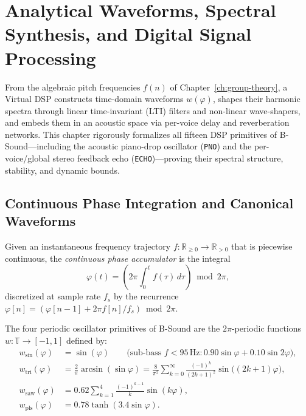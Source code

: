 \chapter{Analytical Waveforms, Spectral Synthesis, and Digital Signal Processing}
\label{ch:waveforms-dsp}

From the algebraic pitch frequencies $f(n)$ of Chapter~\ref{ch:group-theory}, a Virtual DSP constructs time-domain waveforms $w(\varphi)$, shapes their harmonic spectra through linear time-invariant (LTI) filters and non-linear wave-shapers, and embeds them in an acoustic space via per-voice delay and reverberation networks. This chapter rigorously formalizes all fifteen DSP primitives of B-Sound—including the acoustic piano-drop oscillator (\texttt{PNO}) and the per-voice/global stereo feedback echo (\texttt{ECHO})—proving their spectral structure, stability, and dynamic bounds.

\section{Continuous Phase Integration and Canonical Waveforms}

\begin{definition}
Given an instantaneous frequency trajectory $f : \mathbb{R}_{\ge 0} \to \mathbb{R}_{>0}$ that is piecewise continuous, the \emph{continuous phase accumulator} is the integral
\begin{equation}
\label{eq:phase-acc}
\varphi(t) = \left(2\pi \int_0^t f(\tau)\,d\tau\right) \bmod 2\pi,
\end{equation}
discretized at sample rate $f_s$ by the recurrence $\varphi[n] = (\varphi[n-1] + 2\pi f[n]/f_s) \bmod 2\pi$.
\end{definition}

\begin{definition}
The four periodic oscillator primitives of B-Sound are the $2\pi$-periodic functions $w : \mathbb{T} \to [-1, 1]$ defined by:
\begin{align}
w_{\mathrm{sin}}(\varphi) &= \sin(\varphi) \qquad \big(\text{sub-bass } f < 95\,\text{Hz}: 0.90\sin\varphi + 0.10\sin 2\varphi\big), \\
w_{\mathrm{tri}}(\varphi) &= \frac{2}{\pi}\arcsin(\sin\varphi) = \frac{8}{\pi^2}\sum_{k=0}^{\infty}\frac{(-1)^k}{(2k+1)^2}\sin\!\big((2k+1)\varphi\big), \\
w_{\mathrm{saw}}(\varphi) &= 0.62 \sum_{k=1}^{4} \frac{(-1)^{k-1}}{k}\sin(k\varphi), \\
w_{\mathrm{pls}}(\varphi) &= 0.78 \tanh(3.4\sin\varphi).
\end{align}
\end{definition}

